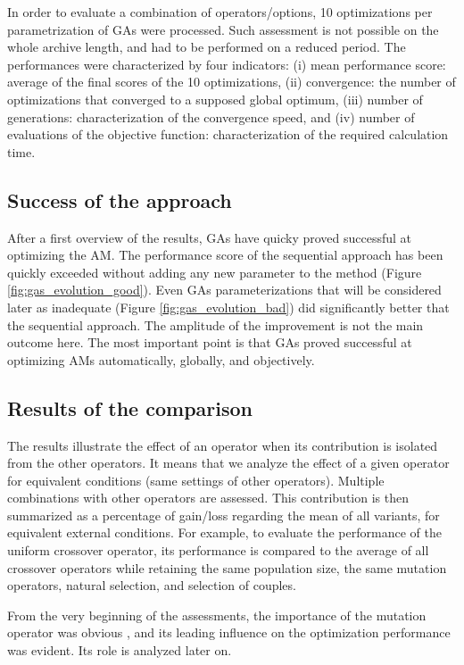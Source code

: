 \documentclass{ametsoc}
\begin{document}
In order to evaluate a combination of operators/options, 10 optimizations per parametrization of GAs were processed. Such assessment is not possible on the whole archive length, and had to be performed on a reduced period. The performances were characterized by four indicators: (i) mean performance score: average of the final scores of the 10 optimizations, (ii) convergence: the number of optimizations that converged to a supposed global optimum, (iii) number of generations: characterization of the convergence speed, and (iv) number of evaluations of the objective function: characterization of the required calculation time.


\subsection{Success of the approach}

After a first overview of the results, GAs have quicky proved successful at optimizing the AM. The performance score of the sequential approach has been quickly exceeded without adding any new parameter to the method (Figure \ref{fig:gas_evolution_good}). Even GAs parameterizations that will be considered later as inadequate (Figure \ref{fig:gas_evolution_bad}) did significantly better that the sequential approach. The amplitude of the improvement is not the main outcome here. The most important point is that GAs proved successful at optimizing AMs automatically, globally, and objectively.


\subsection{Results of the comparison}

The results illustrate the effect of an operator when its contribution is isolated from the other operators. It means that we analyze the effect of a given operator for equivalent conditions (same settings of other operators). Multiple combinations with other operators are assessed. This contribution is then summarized as a percentage of gain/loss regarding the mean of all variants, for equivalent external conditions. For example, to evaluate the performance of the uniform crossover operator, its performance is compared to the average of all crossover operators while retaining the same population size, the same mutation operators, natural selection, and selection of couples.

From the very beginning of the assessments, the importance of the mutation operator was obvious \cite[see][for the details]{Horton2012a}, and its leading influence on the optimization performance was evident. Its role is analyzed later on.
\end{document}
